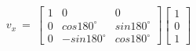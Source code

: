 \documentclass[preview]{standalone}
\begin{document}
\begin{align*}
v_x\ =\ \begin{bmatrix}
                        1 & 0 & 0\\
                        0 & cos180^\circ & sin180^\circ\\
                        0 & -sin180^\circ & cos180^\circ
                        \end{bmatrix}\begin{bmatrix}
                        1\\
                        0\\
                        1
                        \end{bmatrix}\\
\end{align*}
\end{document}
